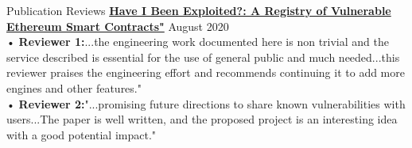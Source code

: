\documentclass{resume} %
\begin{document}

\begin{rSection}{Publication Reviews}
  {\bf{ \href{http://blockchain1000.org/2020/}{Have I Been Exploited?: A Registry of Vulnerable Ethereum Smart Contracts"}}} \hfill {August 2020}\\
  • {\bf{Reviewer 1:}}{...the engineering work documented here is non trivial and the service described is essential for the use of general public and much needed...this reviewer praises the engineering effort and recommends continuing it to add more engines and other features."}\\
  • {\bf{Reviewer 2:}}{"...promising future directions to share known vulnerabilities with users...The paper is well written, and the proposed project is an interesting idea with a good potential impact."}

\end{rSection}
\end{document}
